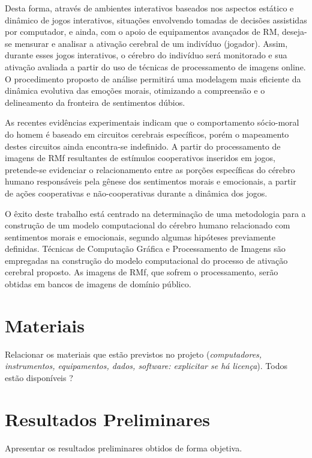 \documentclass[paper=a4, fontsize=11pt]{scrartcl}
\numberwithin{equation}{section}		%
\numberwithin{figure}{section}			%
\numberwithin{table}{section}				%
\begin{document}
Desta forma, através de ambientes interativos baseados nos aspectos estático e dinâmico de jogos interativos, situações envolvendo tomadas de decisões assistidas por computador, e ainda, com o apoio de equipamentos avançados de RM, deseja-se mensurar e analisar a ativação cerebral de um indivíduo (jogador). Assim, durante esses jogos interativos, o cérebro do indivíduo será monitorado e sua ativação avaliada a partir do uso de técnicas de processamento \cite{jensen1987introductory} de imagens online. O procedimento proposto de análise permitirá uma modelagem mais eficiente da dinâmica evolutiva das emoções morais, otimizando a compreensão e o delineamento da fronteira de sentimentos dúbios.

As recentes evidências experimentais indicam que o comportamento sócio-moral do homem é baseado em circuitos cerebrais específicos, porém o mapeamento destes circuitos ainda encontra-se indefinido. A partir do processamento de imagens de RMf resultantes de estímulos cooperativos inseridos em jogos, pretende-se evidenciar o relacionamento entre as porções específicas do cérebro humano responsáveis pela gênese dos sentimentos morais e emocionais, a partir de ações cooperativas e não-cooperativas durante a dinâmica dos jogos.  

O êxito deste trabalho está centrado na determinação de uma metodologia para a construção de um modelo computacional do cérebro humano relacionado com sentimentos morais e emocionais, segundo algumas hipóteses previamente definidas. Técnicas de Computação Gráfica e Processamento de Imagens são empregadas na construção do modelo computacional do processo de ativação cerebral proposto. As imagens de RMf, que sofrem o processamento, serão obtidas em bancos de imagens de domínio público.


\section{Materiais}
	
Relacionar os materiais que estão previstos no projeto (\textit{computadores, instrumentos, equipamentos, dados, software: explicitar se há licença}). Todos estão disponíveis ?


\section{Resultados Preliminares}

Apresentar os resultados preliminares obtidos de forma objetiva.	
\end{document}
